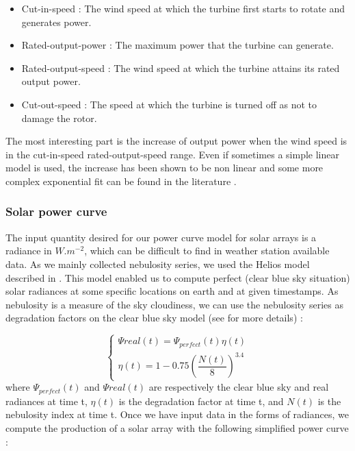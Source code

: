 \documentclass[journal]{IEEEtran}
\begin{document}
\begin{itemize}
\item Cut-in-speed : The wind speed at which the turbine first starts to rotate and generates power.
\item Rated-output-power : The maximum power that the turbine can generate.
\item Rated-output-speed : The wind speed at which the turbine attains its rated output power.
\item Cut-out-speed : The speed at which the turbine is turned off as not to damage the rotor.
\end{itemize}

The most interesting part is the increase of output power when the wind speed is in the cut-in-speed rated-output-speed range. Even if sometimes a simple linear model is used, the increase has been shown to be non linear and some more complex exponential fit can be found in the literature \cite{Lydia2014}.

\subsubsection{Solar power curve}
The input quantity desired for our power curve model for solar arrays is a radiance in $ W.m^{-2} $, which can be difficult to find in weather station available data. As we mainly collected nebulosity series, we used the Helios model described in \cite{Piedallu2007, Piedallu2008}. This model enabled us to compute perfect (clear blue sky situation) solar radiances at some specific locations on earth and at given timestamps. As nebulosity is a measure of the sky cloudiness, we can use the nebulosity series as degradation factors on the clear blue sky model (see \cite{Piedallu2007, Piedallu2008} for more details) :

\begin{equation}
\left\{ \begin{array}{lll}
			\Psi{real}(t) = \Psi_{perfect}(t) \eta(t) \\
			\eta(t) = 1-0.75 \left( \dfrac{N(t)}{8} \right)^{3.4}
\end{array} \right.
\end{equation}
where $ \Psi_{perfect}(t) $ and $ \Psi{real}(t) $ are respectively the clear blue sky and real radiances at time t, $ \eta(t) $ is the degradation factor at time t, and $ N(t) $ is the nebulosity index at time t. Once we have input data in the forms of radiances, we compute the production of a solar array with the following simplified power curve :
\end{document}
